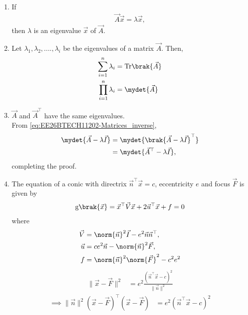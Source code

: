 \begin{enumerate}[label=\thesubsection.\arabic*, ref=\thesubsection.\theenumi]
\item If
\begin{align}
\vec{A}
\vec{x}
=\lambda\vec{x},
\label{eq:EE26BTECH11202-eig-def}
\end{align}
then 
	$\lambda$ is an eigenvalue 
$\vec{x}$
of 
$\vec{A}$.
\item Let $\lambda_1, \lambda_2, .... , \lambda_i$ be the eigenvalues of a matrix $\vec{A}$. Then, 
\begin{align}
	\sum_{i=1}^{n} \lambda_i &= \text{Tr}\brak{\vec{A}} \label{eq:EE26BTECH11202-Matrices_2}
	\\
	\prod_{i=1}^{n} \lambda_i &= \mydet{\vec{A}} \label{eq:EE26BTECH11202-Matrices_3}
\end{align}
\item $\vec{A}$ and $\vec{A}^{\top}$ have the same eigenvalues.
	\\
	\solution From  \eqref{eq:EE26BTECH11202-Matrices_inverse},
\begin{align}
\mydet{\vec{A} - \lambda \vec{I}}
&=
\mydet{\brak{\vec{A} - \lambda \vec{I}}^{\top}}
\\
&=
\mydet{\vec{A}^{\top} - \lambda \vec{I}},
\end{align}
completing the proof.
\item
The equation of  a conic with directrix $\vec{n}^{\top}\vec{x} = c$, eccentricity $e$ and focus $\vec{F}$ is given by 
\begin{align}
    \label{eq:EE26BTECH11202-app-conic_quad_form}
	\text{g}\brak{\vec{x}} = \vec{x}^{\top}\vec{V}\vec{x}+2\vec{u}^{\top}\vec{x}+f=0
    \end{align}
where     
\begin{align}
  \label{eq:EE26BTECH11202-app-conic_quad_form_v}
\vec{V} &=\norm{\vec{n}}^2\vec{I}-e^2\vec{n}\vec{n}^{\top}, 
\\
\label{eq:EE26BTECH11202-app-conic_quad_form_u}
\vec{u} &= ce^2\vec{n}-\norm{\vec{n}}^2\vec{F}, 
\\
\label{eq:EE26BTECH11202-app-conic_quad_form_f}
f &= \norm{\vec{n}}^2\norm{\vec{F}}^2-c^2e^2
    \end{align}
\solution
\begin{align}
\|\vec{x} - \vec{F}\|^2 &= e^2 \frac{(\vec{n}^\top \vec{x} - c)^2}{\|\vec{n}\|^2} 
\end{align}
\begin{align}
\implies \|\vec{n}\|^2 (\vec{x} - \vec{F})^\top (\vec{x} - \vec{F}) &= e^2 \left(\vec{n}^\top \vec{x} - c\right)^2 
\end{align}
\begin{align}

\end{align}
\end{enumerate}
